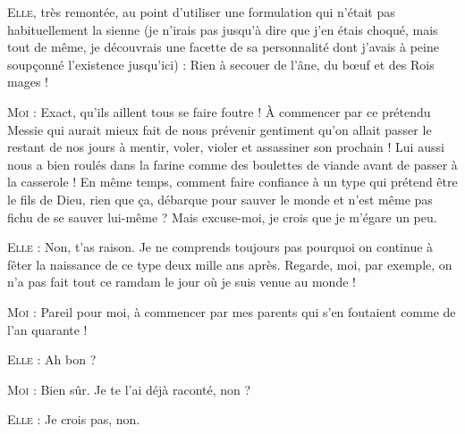 \begin{dialogue}
\textsc{Elle}, très remontée, au point d’utiliser une formulation qui n’était pas habituellement la sienne (je n’irais pas jusqu’à dire que j’en étais choqué, mais tout de même, je découvrais une facette de sa personnalité dont j’avais à peine soupçonné l’existence jusqu’ici) : Rien à secouer de l’âne, du bœuf et des Rois mages !

\textsc{Moi} : Exact, qu’ils aillent tous se faire foutre ! À commencer par ce prétendu Messie qui aurait mieux fait de nous prévenir gentiment qu’on allait passer le restant de nos jours à mentir, voler, violer et assassiner son prochain ! Lui aussi nous a bien roulés dans la farine comme des boulettes de viande avant de passer à la casserole ! En même temps, comment faire confiance à un type qui prétend être le fils de Dieu, rien que ça, débarque pour sauver le monde et n’est même pas fichu de se sauver lui-même ? Mais excuse-moi, je crois que je m’égare un peu.

\textsc{Elle} : Non, t’as raison. Je ne comprends toujours pas pourquoi on continue à fêter la naissance de ce type deux mille ans après. Regarde, moi, par exemple, on n’a pas fait tout ce ramdam le jour où je suis venue au monde !

\textsc{Moi} : Pareil pour moi, à commencer par mes parents qui s’en foutaient comme de l’an quarante !

\textsc{Elle} : Ah bon ?

\textsc{Moi} : Bien sûr. Je te l’ai déjà raconté, non ?

\textsc{Elle} : Je crois pas, non.


\end{dialogue}
